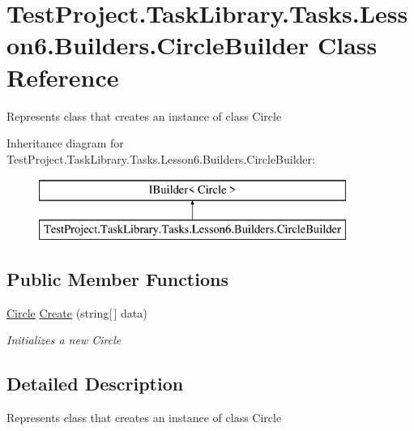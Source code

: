 \hypertarget{class_test_project_1_1_task_library_1_1_tasks_1_1_lesson6_1_1_builders_1_1_circle_builder}{}\section{Test\+Project.\+Task\+Library.\+Tasks.\+Lesson6.\+Builders.\+Circle\+Builder Class Reference}
\label{class_test_project_1_1_task_library_1_1_tasks_1_1_lesson6_1_1_builders_1_1_circle_builder}


Represents class that creates an instance of class Circle  


Inheritance diagram for Test\+Project.\+Task\+Library.\+Tasks.\+Lesson6.\+Builders.\+Circle\+Builder\+:\begin{figure}[H]
\begin{center}
\leavevmode
\includegraphics[height=2.000000cm]{class_test_project_1_1_task_library_1_1_tasks_1_1_lesson6_1_1_builders_1_1_circle_builder}
\end{center}
\end{figure}
\subsection*{Public Member Functions}
\begin{DoxyCompactItemize}
\item 
\mbox{\hyperlink{class_test_project_1_1_task_library_1_1_tasks_1_1_lesson6_1_1_models_1_1_circle}{Circle}} \mbox{\hyperlink{class_test_project_1_1_task_library_1_1_tasks_1_1_lesson6_1_1_builders_1_1_circle_builder_a89da46ce75f30566066db3a30ed53366}{Create}} (string\mbox{[}$\,$\mbox{]} data)
\begin{DoxyCompactList}\small\item\em Initializes a new Circle \end{DoxyCompactList}\end{DoxyCompactItemize}


\subsection{Detailed Description}
Represents class that creates an instance of class Circle 



